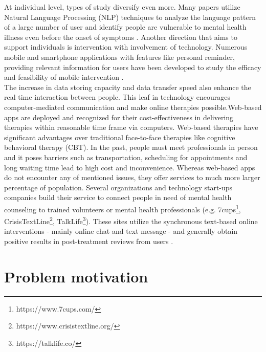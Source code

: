At individual level, types of study diversify even more. Many papers utilize Natural Language Processing (NLP) techniques to analyze the language pattern of a large number of user and identify people are vulnerable to mental health illness even before the onset of symptoms \cite{Almeida, DeChoudhury2013}. Another direction that aims to support individuals is intervention with involvement of technology. Numerous mobile and smartphone applications with features like personal reminder, providing relevant information for users have been developed to study the efficacy and feasibility of mobile intervention \cite{Rathbone2017}. \\

The increase in data storing capacity and data transfer speed also enhance the real time interaction between people. This leaf in technology encourages computer-mediated communication and make online therapies possible.Web-based apps are deployed and recognized for their cost-effectiveness in delivering therapies within reasonable time frame via computers. Web-based therapies have significant advantages over traditional face-to-face therapies like cognitive behavioral therapy (CBT). In the past, people must meet professionals in person and it poses barriers such as transportation, scheduling for appointments and long waiting time lead to high cost and inconvenience. Whereas web-based apps do not encounter any of mentioned issues, they offer services to much more larger percentage of population. Several organizations and technology start-ups companies build their service to connect people in need of mental health counseling to trained volunteers or mental health professionals (e.g. 7cups\footnote{https://www.7cups.com/}, CrisisTextLine\footnote{https://www.crisistextline.org/}, TalkLife\footnote{https://talklife.co/}). These sites utilize the synchronous text-based online interventions - mainly online chat and text message - and generally obtain positive results in post-treatment reviews from users \cite{Hoermann2017}.\\

\section{Problem motivation}
